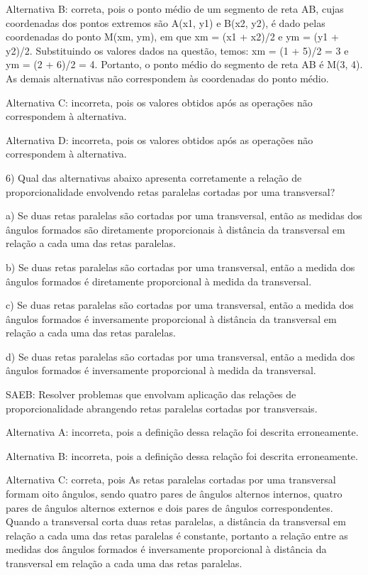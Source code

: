 Alternativa B: correta, pois o ponto médio de um segmento de reta AB,
cujas coordenadas dos pontos extremos são A(x1, y1) e B(x2, y2), é dado
pelas coordenadas do ponto M(xm, ym), em que xm = (x1 + x2)/2 e ym = (y1
+ y2)/2. Substituindo os valores dados na questão, temos: xm = (1 + 5)/2
= 3 e ym = (2 + 6)/2 = 4. Portanto, o ponto médio do segmento de reta AB
é M(3, 4). As demais alternativas não correspondem às coordenadas do
ponto médio.

Alternativa C: incorreta, pois os valores obtidos após as operações não
correspondem à alternativa.

Alternativa D: incorreta, pois os valores obtidos após as operações não
correspondem à alternativa.

6) Qual das alternativas abaixo apresenta corretamente a relação de
proporcionalidade envolvendo retas paralelas cortadas por uma
transversal?

a) Se duas retas paralelas são cortadas por uma transversal, então as
medidas dos ângulos formados são diretamente proporcionais à distância
da transversal em relação a cada uma das retas paralelas.

b) Se duas retas paralelas são cortadas por uma transversal, então a
medida dos ângulos formados é diretamente proporcional à medida da
transversal.

c) Se duas retas paralelas são cortadas por uma transversal, então a
medida dos ângulos formados é inversamente proporcional à distância da
transversal em relação a cada uma das retas paralelas.

d) Se duas retas paralelas são cortadas por uma transversal, então a
medida dos ângulos formados é inversamente proporcional à medida da
transversal.

SAEB: Resolver problemas que envolvam aplicação das relações de
proporcionalidade abrangendo retas paralelas cortadas por transversais.

Alternativa A: incorreta, pois a definição dessa relação foi descrita
erroneamente.

Alternativa B: incorreta, pois a definição dessa relação foi descrita
erroneamente.

Alternativa C: correta, pois As retas paralelas cortadas por uma
transversal formam oito ângulos, sendo quatro pares de ângulos alternos
internos, quatro pares de ângulos alternos externos e dois pares de
ângulos correspondentes. Quando a transversal corta duas retas
paralelas, a distância da transversal em relação a cada uma das retas
paralelas é constante, portanto a relação entre as medidas dos ângulos
formados é inversamente proporcional à distância da transversal em
relação a cada uma das retas paralelas.

